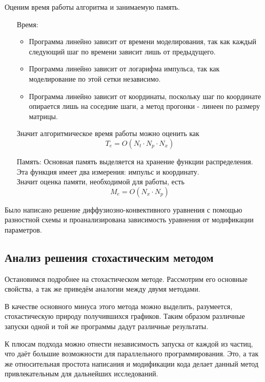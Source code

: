 \documentclass[a4paper,14pt]{extarticle} %
\begin{document}
Оценим время работы алгоритма и занимаемую память.
\begin{enumerate}
\item[Время:] 
\begin{itemize}
\item Программа линейно зависит от времени моделирования, так как каждый следующий шаг по времени зависит лишь от предыдущего.
\item Программа линейно зависит от логарифма импульса, так как моделирование по этой сетки независимо.
\item Программа линейно зависит от координаты, поскольку шаг по координате опирается лишь на соседние шаги, а метод прогонки - линеен по размеру матрицы.
\end{itemize}
Значит алгоритмическое время работы можно оценить как 
\begin{equation}
T_{e} = O(N_t\cdot N_p\cdot N_x)
\label{Te}
\end{equation}

\item[Память:] Основная память выделяется на хранение функции распределения. Эта функция имеет два измерения: импульс и координату.\\
Значит оценка памяти, необходимой для работы, есть 
\begin{equation}
M_e = O(N_x\cdot N_p)
\label{Me}
\end{equation}

\end{enumerate}

Было написано решение диффузиозно-конвективного уравнения с помощью разностной схемы и проанализирована зависимость уравнения от модификации параметров.
\subsection{Анализ решения стохастическим методом}
Остановимся подробнее на стохастическом методе. Рассмотрим его основные свойства, а так же приведём аналогии между двумя методами.

В качестве основного минуса этого метода можно выделить, разумеется, стохастическую природу получившихся графиков. Таким образом различные запуски одной и той же программы дадут различные результаты.

К плюсам подхода можно отнести независимость запуска от каждой из частиц, что даёт большие возможности для параллельного программирования. Это, а так же относительная простота написания и модификации кода делает данный метод привлекательным для дальнейших исследований.
\end{document}
